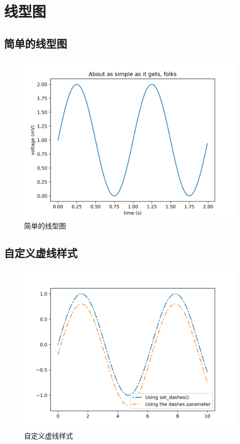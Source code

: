 \documentclass[openany]{progbookcn}
\begin{document}
\section{线型图}
\subsection{简单的线型图}

\begin{figure}[H]
\centering
\includegraphics[width=0.6 \textwidth]{figs/chapter9/lines/SimpleLine}
\caption{简单的线型图}
\end{figure}

\subsection{自定义虚线样式}

\begin{figure}[H]
\centering
\includegraphics[width=0.6 \textwidth]{figs/chapter9/lines/CustomizeLineStyle}
\caption{自定义虚线样式}
\end{figure}
\end{document}
